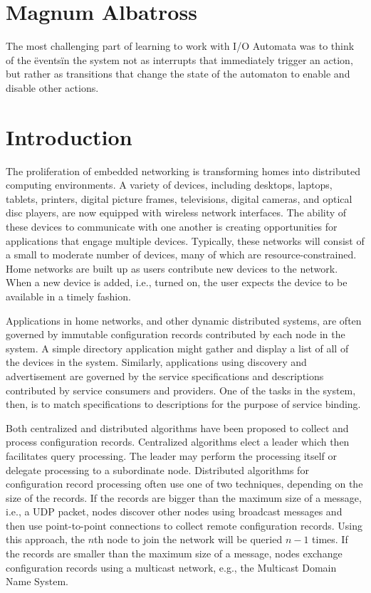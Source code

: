 \documentclass[letterpaper]{article}
\begin{document}
\section{Magnum Albatross}
The most challenging part of learning to work with I/O Automata was to think of the \"events\" in the system not as interrupts that immediately trigger an action, but rather as transitions that change the state of the automaton to enable and disable other actions.


\section{Introduction}
The proliferation of embedded networking is transforming homes into distributed computing environments.
A variety of devices, including desktops, laptops, tablets, printers, digital picture frames, televisions, digital cameras, and optical disc players, are now equipped with wireless network interfaces.
The ability of these devices to communicate with one another is creating opportunities for applications that engage multiple devices.
Typically, these networks will consist of a small to moderate number of devices, many of which are resource-constrained.
Home networks are built up as users contribute new devices to the network.
When a new device is added, i.e., turned on, the user expects the device to be available in a timely fashion.

Applications in home networks, and other dynamic distributed systems, are often governed by immutable configuration records contributed by each node in the system.
A simple directory application might gather and display a list of all of the devices in the system.
Similarly, applications using discovery and advertisement are governed by the service specifications and descriptions contributed by service consumers and providers.
One of the tasks in the system, then, is to match specifications to descriptions for the purpose of service binding.

Both centralized and distributed algorithms have been proposed to collect and process configuration records.
Centralized algorithms elect a leader which then facilitates query processing.
The leader may perform the processing itself or delegate processing to a subordinate node.
Distributed algorithms for configuration record processing often use one of two techniques, depending on the size of the records.
If the records are bigger than the maximum size of a message, i.e., a UDP packet, nodes discover other nodes using broadcast messages and then use point-to-point connections to collect remote configuration records.
Using this approach, the $n$th node to join the network will be queried $n-1$ times.
If the records are smaller than the maximum size of a message, nodes exchange configuration records using a multicast network, e.g., the Multicast Domain Name System.
\end{document}
